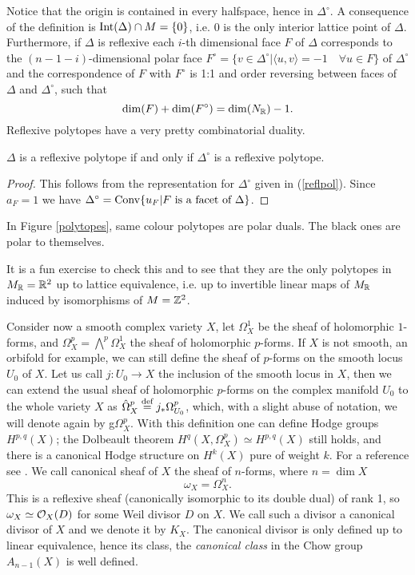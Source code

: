 \documentclass[../main.tex]{subfiles}
\begin{document}
Notice that the origin is contained in every halfspace, hence in $\Delta^\circ$. A consequence of the definition is $\operatorname{Int}(\Delta) \cap M = \{0\}$, i.e. $0$ is the only interior lattice point of $\Delta$.
Furthermore, if $\Delta$ is reflexive each $i$-th dimensional face $F$  of $\Delta$ corresponds to the $(n-1-i)$-dimensional polar face $F^\circ= \{v \in \Delta^\circ | \langle u, v\rangle = -1 \quad \forall u \in F \}$ of $\Delta^\circ$ and the correspondence of $F$ with $F^\circ$ is 1:1 and order reversing between faces of $\Delta$ and $\Delta^\circ$, such that
\[
\dim(F) + \dim(F^\circ) = \dim(N_{\mathbb{R}}) - 1.
\]
Reflexive polytopes have a very pretty combinatorial duality.

\begin{proposition} \label{reflexive}
     $\Delta$ is a reflexive polytope if and only if $\Delta^\circ$
is a reflexive polytope.
\end{proposition} 
\begin{proof}
    This follows from the representation for $\Delta^\circ$
given in (\ref{reflpol}). Since $a_F = 1$ we have  $\Delta^\circ = \operatorname{Conv} \{ u_F | F \text{ is a facet of } \Delta \}$.
\end{proof} 

In Figure \ref{polytopes}, same colour polytopes are polar duals. The black ones are polar to themselves.
\begin{ex}
It is a fun exercise to check this and to see that they are the only polytopes in $M_{\mathbb{R}} =\mathbb{R}^2$ up to lattice equivalence, i.e. up to invertible linear maps of $M_{\mathbb{R}}$ induced by isomorphisms of $M=\mathbb{Z}^2$.
\end{ex}


Consider now a smooth complex variety $X$, let $\Omega^1_X$ be the sheaf of holomorphic $1$-forms, and $\Omega^p_X = \bigwedge^p \Omega^1_X$ the sheaf of holomorphic $p$-forms.
If $X$ is not smooth, an orbifold for example, we can still define the sheaf of $p$-forms on the smooth locus $U_0$ of $X$.
Let us call $j \colon U_0 \to X$ the inclusion of the smooth locus in $X$, then we can extend the usual sheaf of holomorphic $p$-forms on the complex manifold $U_0$ to the whole variety $X$ as ${\hat{\Omega}}^p_X  \stackrel{\text{def}}{=}  j_*\Omega^p_{U_0}$,
which, with a slight abuse of notation, we will denote again by g$\Omega^p_X$. With this definition one can define Hodge groups $H^{p,q}(X)$; the Dolbeault theorem $H^q(X,\Omega^p_X) \simeq H^{p,q}(X)$ still holds, and there is a canonical Hodge structure on $H^{k}(X)$ pure of weight $k$. For a reference see \cite{St77}.
We call canonical sheaf of $X$ the sheaf of $n$-forms, where $n = \dim X$
\begin{equation*}
\omega_X = \Omega^n_X.
\end{equation*}
This is a reflexive sheaf (canonically isomorphic to its double dual) of rank 1, so $\omega_{X} \simeq  \mathcal{O}_{X} (D )$ for some Weil divisor $D$ on $X$. We call such a divisor a canonical divisor of $X$ and we denote it by $K_X$. The canonical divisor is only defined up to linear equivalence, hence its class, the \emph{canonical class} in the Chow group $A_{n-1}(X)$ is well defined.
\end{document}
